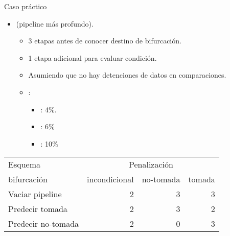 \begin{frame}[t]{Caso práctico}
\begin{itemize}
  \item {} (pipeline más profundo).
    \begin{itemize}
      \item 3 etapas antes de conocer destino de bifurcación.
      \item 1 etapa adicional para evaluar condición.
      \item Asumiendo que no hay detenciones de datos en comparaciones.
      \item {}:
        \begin{itemize}
          \item {}: 4\%.
          \item {}: 6\%
          \item {}: 10\%
        \end{itemize}
    \end{itemize}
\end{itemize}

{\scriptsize
\begin{tabular}[c]{|p{}|*{3}{p{}|}}
\hline
Esquema &  \multicolumn{3}{c|}{Penalización}
\\
\cline{2-4}
bifurcación & incondicional & no-tomada & tomada
\\
\hline\hline

Vaciar pipeline &
\multicolumn{1}{r|}{2} & 
\multicolumn{1}{r|}{3} & 
\multicolumn{1}{r|}{3}
\\
\hline

Predecir tomada &
\multicolumn{1}{r|}{2} & 
\multicolumn{1}{r|}{3} &
\multicolumn{1}{r|}{2}
\\
\hline

Predecir no-tomada &
\multicolumn{1}{r|}{2} &
\multicolumn{1}{r|}{0} &
\multicolumn{1}{r|}{3}
\\

\hline
\end{tabular}
}
\end{frame}

